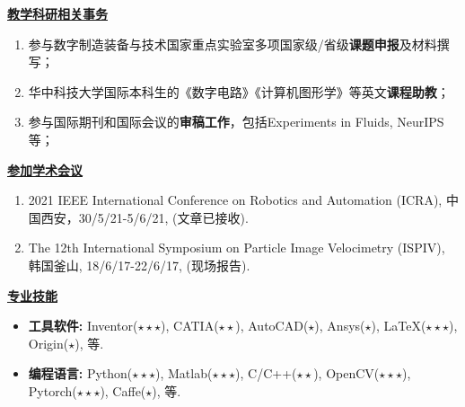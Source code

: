 \documentclass[a4paper,fontsize=11pt]{scrartcl} %
\newcommand{\stitle}[1]{
	\noindent\underline{\textbf{#1}} \normalsize\par}
\begin{document}
\stitle{教学科研相关事务}
\begin{enumerate}
	\setlength\itemsep{0.0cm}
	\item 参与数字制造装备与技术国家重点实验室多项国家级/省级\textbf{课题申报}及材料撰写；
	\item 华中科技大学国际本科生的《数字电路》《计算机图形学》等英文\textbf{课程助教}；
	\item 参与国际期刊和国际会议的\textbf{审稿工作}，包括Experiments in Fluids, NeurIPS等；
\end{enumerate}


\stitle{参加学术会议}
\begin{enumerate}
	\setlength\itemsep{0.0cm}
	\item 2021 IEEE International Conference on Robotics and Automation (ICRA), 中国西安，30/5/21-5/6/21, (文章已接收).
	\item The 12th International Symposium on Particle Image Velocimetry (ISPIV), 韩国釜山, 18/6/17-22/6/17, (现场报告).	
\end{enumerate}

\stitle{专业技能}
\begin{itemize}
		\setlength\itemsep{0.0cm}
		\item \textbf{工具软件:}	Inventor($\star\star\star$), CATIA($\star\star$), AutoCAD($\star$), Ansys($\star$), \LaTeX($\star\star\star$), Origin($\star$), 等.
		\item \textbf{编程语言:}	Python($\star\star\star$), Matlab($\star\star\star$), C/C++($\star\star$), OpenCV($\star\star\star$), Pytorch($\star\star\star$), Caffe($\star$), 等.
\end{itemize}



\end{document}
